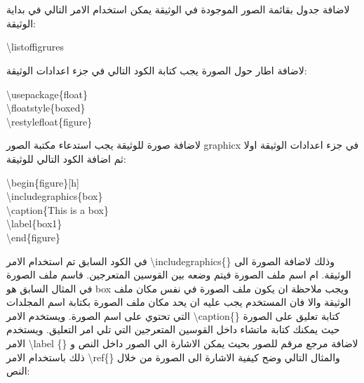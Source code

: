 \\
\\
لاضافة جدول بقائمة الصور الموجودة في الوثيقة يمكن استخدام الامر التالي في بداية الوثيقة:\\
\begin{english}
\begin{mybox}
\textbackslash listoffigrures
\end{mybox}
\end{english}
لاضافة اطار حول الصورة يجب كتابة الكود التالي في جزء اعدادات الوثيقة:\\
\begin{english}
\begin{mybox}
\textbackslash usepackage\{float\}\\
\textbackslash floatstyle\{boxed\} \\
\textbackslash restylefloat\{figure\}
\end{mybox}
\end{english}
لاضافة صورة للوثيقة يجب استدعاء مكتبة الصور graphicx في جزء اعدادات الوثيقة اولا ثم اضافة الكود التالي للوثيقة:\\
\begin{english}
\begin{mybox}
\textbackslash begin\{figure\}[h]\\
\textbackslash includegraphics\{box\}\\
\textbackslash caption\{This is a box\}\\
\textbackslash label\{box1\}\\
\textbackslash end\{figure\}
\end{mybox}
\end{english}
في الكود السابق تم استخدام الامر 
\textbackslash includegraphics\{\} وذلك لاضافة الصورة الى الوثيقة. ام اسم ملف الصورة فيتم وضعه بين القوسين المتعرجين. فاسم ملف الصورة في المثال السابق هو 
box 
ويجب ملاحظة ان يكون ملف الصورة في نفس مكان ملف الوثيقة والا فان المستخدم يجب عليه ان يحد مكان ملف الصورة بكتابة اسم المجلدات التي تحتوي على اسم الصورة. ويستخدم الامر 
\textbackslash caption\{\} 
كتابة تعليق على الصورة حيث يمكنك كتابة ماتشاء داخل القوسين المتعرجين التي تلي امر التعليق. ويستخدم الامر 
\textbackslash label \{\}
لاضافة مرجع مرقم للصور بحيث يمكن الاشارة الي الصور داخل النص و ذلك باستخدام الامر 
\textbackslash ref\{\}
والمثال التالي وضح كيفية الاشارة الى الصورة من خلال النص:\\

